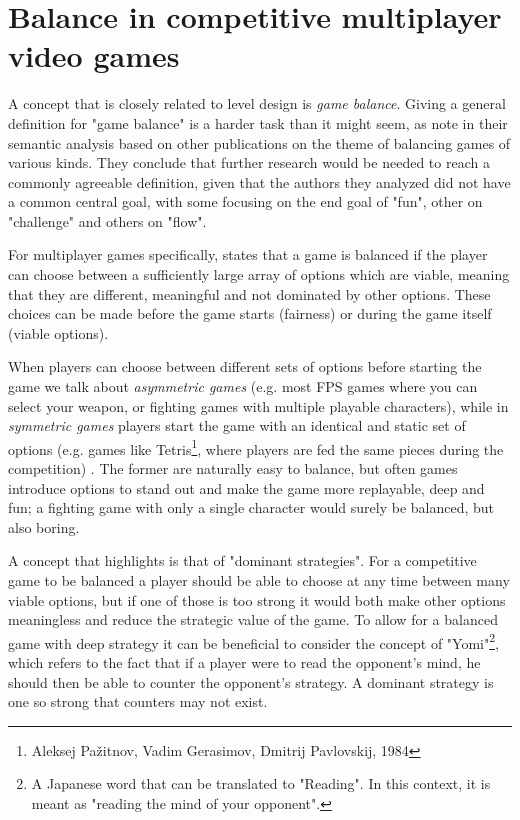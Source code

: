 \section{Balance in competitive multiplayer video games}
\label{sec:balance}
A concept that is closely related to level design is \textit{game balance}. Giving a general definition for "game balance" is a harder task than it might seem, as \citeauthor{becker_what_2020} note in their semantic analysis based on other publications on the theme of balancing games of various kinds. They conclude that further research would be needed to reach a commonly agreeable definition, given that the authors they analyzed did not have a common central goal, with some focusing on the end goal of "fun", other on "challenge" and others on "flow". \cite{becker_what_2020}

For multiplayer games specifically, \citeauthor{sirlin_balancing_2014} states that a game is balanced if the player can choose between a sufficiently large array of options which are viable, meaning that they are different, meaningful and not dominated by other options. These choices can be made before the game starts (fairness) or during the game itself (viable options). \cite{sirlin_balancing_2014}

When players can choose between different sets of options before starting the game we talk about \textit{asymmetric games} (e.g. most FPS games where you can select your weapon, or fighting games with multiple playable characters), while in \textit{symmetric games} players start the game with an identical and static set of options (e.g. games like Tetris\footnote{Aleksej Pažitnov, Vadim Gerasimov, Dmitrij Pavlovskij, 1984}, where players are fed the same pieces during the competition) \cite{sirlin_balancing_2014}. The former are naturally easy to balance, but often games introduce options to stand out and make the game more replayable, deep and fun; a fighting game with only a single character would surely be balanced, but also boring. 

A concept that \citeauthor{sirlin_balancing_2014} highlights is that of "dominant strategies". For a competitive game to be balanced a player should be able to choose at any time between many viable options, but if one of those is too strong it would both make other options meaningless and reduce the strategic value of the game. To allow for a balanced game with deep strategy it can be beneficial to consider the concept of "Yomi"\footnote{A Japanese word that can be translated to "Reading". In this context, it is meant as "reading the mind of your opponent".}, which refers to the fact that if a player were to read the opponent's mind, he should then be able to counter the opponent's strategy. A dominant strategy is one so strong that counters may not exist. \cite{sirlin_balancing_2014}

